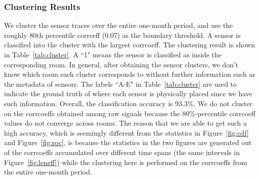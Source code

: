 \subsubsection{Clustering Results}
We cluster the sensor traces over the entire one-month period, and use the roughly 80th percentile corrceff (0.07) as the boundary threshold. 
A sensor is classified into the cluster with the largest corrcoeff. The clustering result is shown in Table~\ref{tab:cluster}.  A ``1" means the sensor is classified as inside the corresponding room. 
In general, after obtaining the sensor clusters, we don't know which room each cluster corresponds to without further information such as the metadata of sensors. The labels ``A-E" in Table~\ref{tab:cluster} are used to indicate the ground truth of where each sensor is physically placed since we have such information. Overall, the classification accuracy 
is 93.3\%.  We do not cluster on the corrcoeffs obtained among raw signals because the 80\%-percentile corrcoeff values do not converge across rooms.
The reason that we are able to get such a high accuracy, which is seemingly different from the statistics in Figure~\ref{fig:cdf} 
and Figure~\ref{fig:roc}, is because the statistics in the two figures are generated out of the corrcoeffs accumulated over different time spans (the same intervals in Figure~\ref{fig:leneff}) while the clustering here is performed on the corrcoeffs from the entire one-month period. 

